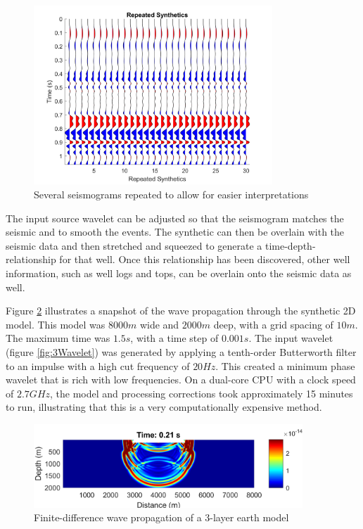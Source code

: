 \documentclass[12pt]{article}
\begin{document}
\begin{figure}[!htb]
	\centering
	\includegraphics[width=0.8\textwidth]{Figures/FD3SeveralSynthetics.png}
	\caption[Finite-difference 3-layer several synthetic seismograms]{Several seismograms repeated to allow for easier interpretations}
	\label{fig:FD3StackedSeveral}
\end{figure}
	
	The input source wavelet can be adjusted so that the seismogram matches the seismic and to smooth the events. The synthetic can then be overlain with the seismic data and then stretched and squeezed to generate a time-depth-relationship for that well. Once this relationship has been discovered, other well information, such as well logs and tops, can be overlain onto the seismic data as well.
	
	Figure \ref{fig:FD3} illustrates a snapshot of the wave propagation through the synthetic 2D model. This model was $8000 m$ wide and $2000 m$ deep, with a grid spacing of $10 m$. The maximum time was $1.5 s$, with a time step of $0.001 s$. The input wavelet (figure \ref{fig:3Wavelet})  was generated by applying a tenth-order Butterworth filter to an impulse with a high cut frequency of $20 Hz$. This created a minimum phase wavelet that is rich with low frequencies. On a dual-core CPU with a clock speed of $2.7 GHz$, the model and processing corrections took approximately 15 minutes to run, illustrating that this is a very computationally expensive method.
	
\begin{figure}[!htb]
	\centering
	\includegraphics[width=0.9\textwidth]{Figures/FD3Movie_132.png}
	\caption[Finite-difference 3-layer wave propagation]{Finite-difference wave propagation of a 3-layer earth model}
	\label{fig:FD3}
\end{figure}
\end{document}
